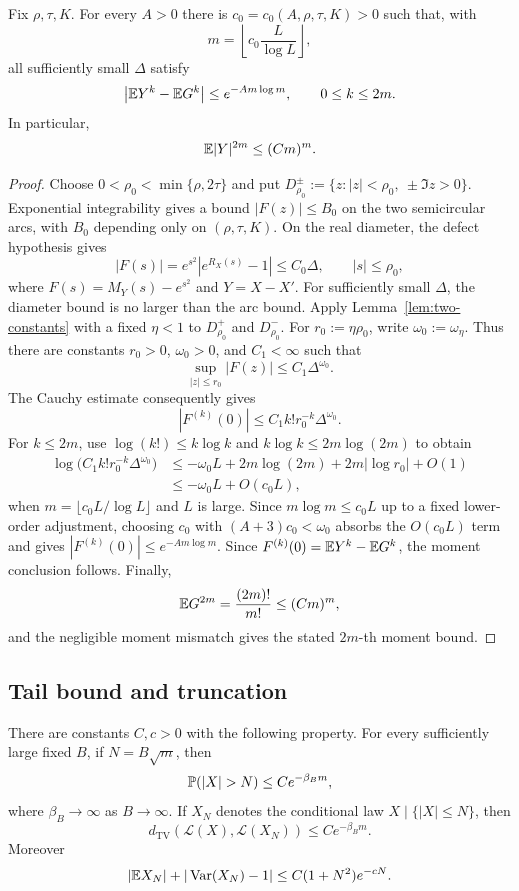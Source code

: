 \begin{lemma}\label{lem:moment-transfer}
Fix $\rho,\tau,K$. For every $A>0$ there is $c_0=c_0(A,\rho,\tau,K)>0$ such that, with
\[
m=\left\lfloor c_0\frac{L}{\log L}\right\rfloor,
\]
all sufficiently small $\Delta$ satisfy
\[
\left|\mathbb E Y^k-\mathbb E G^k\right|
\le e^{-A m\log m},
\qquad 0\le k\le2m.
\]
In particular,
\[
\mathbb E|Y|^{2m}\le (C m)^m.
\]
\end{lemma}

\begin{proof}
Choose $0<\rho_0<\min\{\rho,2\tau\}$ and put $D_{\rho_0}^{\pm}:=\{z:|z|<\rho_0,\ \pm\Im z>0\}$. Exponential integrability gives a bound $|F(z)|\le B_0$ on the two semicircular arcs, with $B_0$ depending only on $(\rho,\tau,K)$. On the real diameter, the defect hypothesis gives
\[
|F(s)|=e^{s^2}|e^{R_X(s)}-1|\le C_0\Delta,
\qquad |s|\le\rho_0,
\]
where $F(s)=M_Y(s)-e^{s^2}$ and $Y=X-X'$. For sufficiently small $\Delta$, the diameter bound is no larger than the arc bound. Apply Lemma~\ref{lem:two-constants} with a fixed $\eta<1$ to $D_{\rho_0}^{+}$ and $D_{\rho_0}^{-}$. For $r_0:=\eta\rho_0$, write $\omega_0:=\omega_\eta$. Thus there are constants $r_0>0$, $\omega_0>0$, and $C_1<\infty$ such that
\[
\sup_{|z|\le r_0}|F(z)|\le C_1\Delta^{\omega_0}.
\]
The Cauchy estimate consequently gives
\[
|F^{(k)}(0)|\le C_1 k! r_0^{-k}\Delta^{\omega_0}.
\]
For $k\le2m$, use $\log(k!)\le k\log k$ and $k\log k\le2m\log(2m)$ to obtain
\[
\begin{aligned}
\log\bigl(C_1k!r_0^{-k}\Delta^{\omega_0}\bigr)
&\le -\omega_0L+2m\log(2m)+2m|\log r_0|+O(1)\\
&\le -\omega_0L+O(c_0L),
\end{aligned}
\]
when $m=\lfloor c_0L/\log L\rfloor$ and $L$ is large. Since $m\log m\le c_0L$ up to a fixed lower-order adjustment, choosing $c_0$ with $(A+3)c_0<\omega_0$ absorbs the $O(c_0L)$ term and gives $|F^{(k)}(0)|\le e^{-Am\log m}$. Since $F^{(k)}(0)=\mathbb E Y^k-\mathbb E G^k$, the moment conclusion follows. Finally,
\[
\mathbb E G^{2m}=\frac{(2m)!}{m!}\le(Cm)^m,
\]
and the negligible moment mismatch gives the stated $2m$-th moment bound.
\end{proof}

\subsection{Tail bound and truncation}

\begin{lemma}\label{lem:tail-lift}
There are constants $C,c>0$ with the following property. For every sufficiently large fixed $B$, if $N=B\sqrt m$, then
\[
\Pp(|X|>N)\le C e^{-\beta_Bm},
\]
where $\beta_B\to\infty$ as $B\to\infty$.
If $X_N$ denotes the conditional law $X\mid\{|X|\le N\}$, then
\[
d_{\mathrm{TV}}(\mathcal L(X),\mathcal L(X_N))\le C e^{-\beta_Bm}.
\]
Moreover
\[
|\mathbb E X_N|+|\operatorname{Var}(X_N)-1|
\le C(1+N^2)e^{-cN}.
\]
\end{lemma}

